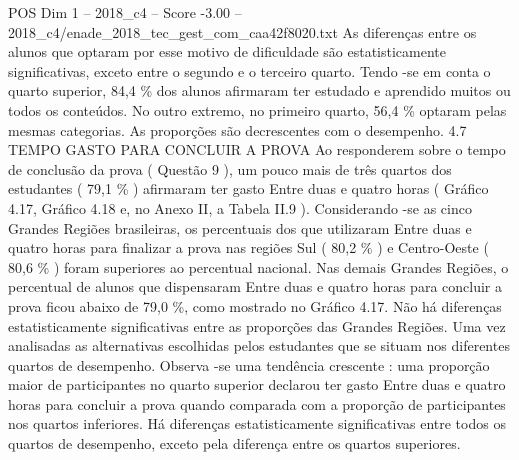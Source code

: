 \begin{textsample}{POS Dim 1 – 2018\_c4 – Score -3.00 – 2018\_c4/enade\_2018\_tec\_gest\_com\_caa42f8020.txt}
As diferenças entre os alunos que optaram por esse motivo de dificuldade são estatisticamente significativas, exceto entre o segundo e o terceiro quarto.
Tendo -se em conta o quarto superior, 84,4 \% dos alunos afirmaram ter estudado e aprendido muitos ou todos os conteúdos.
No outro extremo, no primeiro quarto, 56,4 \% optaram pelas mesmas categorias.
As proporções são decrescentes com o desempenho. 4.7 TEMPO GASTO PARA CONCLUIR A PROVA Ao responderem sobre o tempo de conclusão da prova ( Questão 9 ), um pouco mais de três quartos dos estudantes ( 79,1 \% ) afirmaram ter gasto Entre duas e quatro horas ( Gráfico 4.17, Gráfico 4.18 e, no Anexo II, a Tabela II.9 ).
Considerando -se as cinco Grandes Regiões brasileiras, os percentuais dos que utilizaram Entre duas e quatro horas para finalizar a prova nas regiões Sul ( 80,2 \% ) e Centro-Oeste ( 80,6 \% ) foram superiores ao percentual nacional.
Nas demais Grandes Regiões, o percentual de alunos que dispensaram Entre duas e quatro horas para concluir a prova ficou abaixo de 79,0 \%, como mostrado no Gráfico 4.17.
Não há diferenças estatisticamente significativas entre as proporções das Grandes Regiões.
Uma vez analisadas as alternativas escolhidas pelos estudantes que se situam nos diferentes quartos de desempenho.
Observa -se uma tendência crescente : uma proporção maior de participantes no quarto superior declarou ter gasto Entre duas e quatro horas para concluir a prova quando comparada com a proporção de participantes nos quartos inferiores.
Há diferenças estatisticamente significativas entre todos os quartos de desempenho, exceto pela diferença entre os quartos superiores.

\end{textsample}
